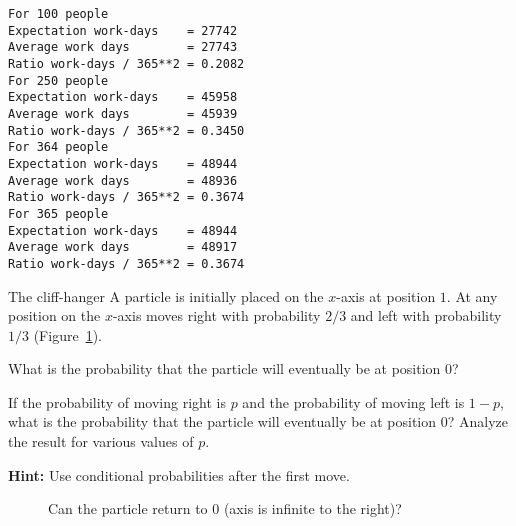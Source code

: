 \sml{}
\begin{verbatim}
For 100 people
Expectation work-days    = 27742
Average work days        = 27743
Ratio work-days / 365**2 = 0.2082
For 250 people
Expectation work-days    = 45958
Average work days        = 45939
Ratio work-days / 365**2 = 0.3450
For 364 people
Expectation work-days    = 48944
Average work days        = 48936
Ratio work-days / 365**2 = 0.3674
For 365 people
Expectation work-days    = 48944
Average work days        = 48917
Ratio work-days / 365**2 = 0.3674
\end{verbatim}


\newpage

\begin{prob}{The cliff-hanger}
A particle is initially placed on the $x$-axis at position $1$. At any position on the $x$-axis moves right with probability $2/3$ and left with probability $1/3$ (Figure~\ref{f.ruin1}).

 What is the probability that the particle will eventually be at position $0$?

 If the probability of moving right is $p$ and the probability of moving left is $1-p$, what is the probability that the particle will eventually be at position $0$? Analyze the result for various values of $p$.

\textbf{Hint:} Use conditional probabilities after the first move.
\begin{figure}[tb]
\begin{center}
\end{center}
\caption{Can the particle return to $0$ (axis is infinite to the right)?}\label{f.ruin1}
\end{figure}
\end{prob}

